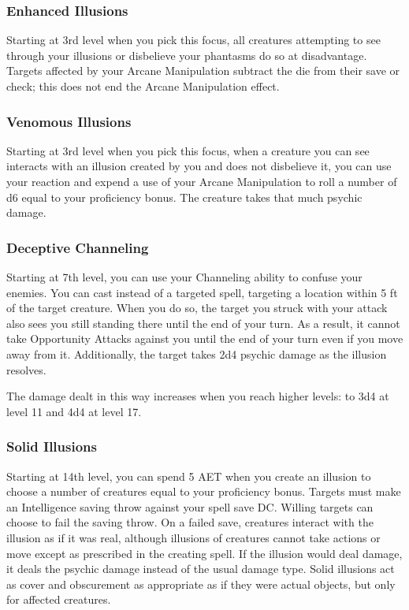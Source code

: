 \subsubsection{Enhanced Illusions}
Starting at 3rd level when you pick this focus, all creatures attempting to see through your illusions or disbelieve your phantasms do so at disadvantage. Targets affected by your Arcane Manipulation subtract the die from their save or check; this does not end the Arcane Manipulation effect.

\subsubsection{Venomous Illusions}
Starting at 3rd level when you pick this focus, when a creature you can see interacts with an illusion created by you and does not disbelieve it, you can use your reaction and expend a use of your Arcane Manipulation to roll a number of d6 equal to your proficiency bonus. The creature takes that much psychic damage.

\subsubsection{Deceptive Channeling}
Starting at 7th level, you can use your Channeling ability to confuse your enemies. You can cast  instead of a targeted spell, targeting a location within 5 ft of the target creature. When you do so, the target you struck with your attack also sees you still standing there until the end of your turn. As a result, it cannot take Opportunity Attacks against you until the end of your turn even if you move away from it. Additionally, the target takes 2d4 psychic damage as the illusion resolves.

The damage dealt in this way increases when you reach higher levels: to 3d4 at level 11 and 4d4 at level 17.

\subsubsection{Solid Illusions}
Starting at 14th level, you can spend 5 AET when you create an illusion to choose a number of creatures equal to your proficiency bonus. Targets must make an Intelligence saving throw against your spell save DC. Willing targets can choose to fail the saving throw. On a failed save, creatures interact with the illusion as if it was real, although illusions of creatures cannot take actions or move except as prescribed in the creating spell. If the illusion would deal damage, it deals the psychic damage instead of the usual damage type. Solid illusions act as cover and obscurement as appropriate as if they were actual objects, but only for affected creatures.

